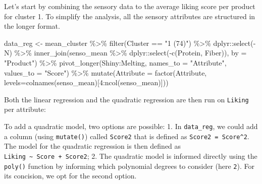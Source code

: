 \documentclass[
]{krantz}
\makeatletter
\newenvironment{Shaded}{\begin{snugshade}}{\end{snugshade}}
\newcommand{\AttributeTok}[1]{\textcolor[rgb]{0.61,0.61,0.61}{#1}}
\newcommand{\DecValTok}[1]{\textcolor[rgb]{0.06,0.06,0.06}{#1}}
\newcommand{\FunctionTok}[1]{\textcolor[rgb]{0,0,0}{#1}}
\newcommand{\NormalTok}[1]{#1}
\newcommand{\OtherTok}[1]{\textcolor[rgb]{0.37,0.37,0.37}{#1}}
\newcommand{\SpecialCharTok}[1]{\textcolor[rgb]{0,0,0}{#1}}
\newcommand{\StringTok}[1]{\textcolor[rgb]{0.5,0.5,0.5}{#1}}
\renewenvironment{quote}{\begin{VF}}{\end{VF}}
\newenvironment{kframe}{%
\medskip{}
\setlength{\fboxsep}{.8em}
 \def\at@end@of@kframe{}%
 \ifinner\ifhmode%
  \def\at@end@of@kframe{\end{minipage}}%
  \begin{minipage}{\columnwidth}%
 \fi\fi%
 \def\FrameCommand##1{\hskip\@totalleftmargin \hskip-\fboxsep
 \colorbox{shadecolor}{##1}\hskip-\fboxsep
     \hskip-\linewidth \hskip-\@totalleftmargin \hskip\columnwidth}%
 \MakeFramed {\advance\hsize-\width
   \@totalleftmargin\z@ \linewidth\hsize
   \@setminipage}}%
 {\par\unskip\endMakeFramed%
 \at@end@of@kframe}
\renewenvironment{Shaded}{\begin{kframe}}{\end{kframe}}
\makeatother
\begin{document}
Let's start by combining the sensory data to the average liking score per product for cluster 1. To simplify the analysis, all the sensory attributes are structured in the longer format.

\begin{Shaded}
\begin{Highlighting}[]
\NormalTok{data\_reg }\OtherTok{\textless{}{-}}\NormalTok{ mean\_cluster }\SpecialCharTok{\%\textgreater{}\%}
  \FunctionTok{filter}\NormalTok{(Cluster }\SpecialCharTok{==} \StringTok{"1 (74)"}\NormalTok{) }\SpecialCharTok{\%\textgreater{}\%}
\NormalTok{  dplyr}\SpecialCharTok{::}\FunctionTok{select}\NormalTok{(}\SpecialCharTok{{-}}\NormalTok{N) }\SpecialCharTok{\%\textgreater{}\%}
  \FunctionTok{inner\_join}\NormalTok{(senso\_mean }\SpecialCharTok{\%\textgreater{}\%} 
\NormalTok{               dplyr}\SpecialCharTok{::}\FunctionTok{select}\NormalTok{(}\SpecialCharTok{{-}}\FunctionTok{c}\NormalTok{(Protein, Fiber)), }\AttributeTok{by =} \StringTok{"Product"}\NormalTok{) }\SpecialCharTok{\%\textgreater{}\%}
  \FunctionTok{pivot\_longer}\NormalTok{(Shiny}\SpecialCharTok{:}\NormalTok{Melting, }
               \AttributeTok{names\_to =} \StringTok{"Attribute"}\NormalTok{, }\AttributeTok{values\_to =} \StringTok{"Score"}\NormalTok{) }\SpecialCharTok{\%\textgreater{}\%}
  \FunctionTok{mutate}\NormalTok{(}\AttributeTok{Attribute =} 
           \FunctionTok{factor}\NormalTok{(Attribute, }
                  \AttributeTok{levels=}\FunctionTok{colnames}\NormalTok{(senso\_mean)[}\DecValTok{4}\SpecialCharTok{:}\FunctionTok{ncol}\NormalTok{(senso\_mean)]))}
\end{Highlighting}
\end{Shaded}

Both the linear regression and the quadratic regression are then run on \texttt{Liking} per attribute:

\begin{quote}
To add a quadratic model, two options are possible:
1. In \texttt{data\_reg}, we could add a column (using \texttt{mutate()}) called \texttt{Score2} that is defined as \texttt{Score2\ =\ Score\^{}2}. The model for the quadratic regression is then defined as \texttt{Liking\ \textasciitilde{}\ Score\ +\ Score2};
2. The quadratic model is informed directly using the \texttt{poly()} function by informing which polynomial degrees to consider (here \texttt{2}).
For its concision, we opt for the second option.
\end{quote}
\end{document}
